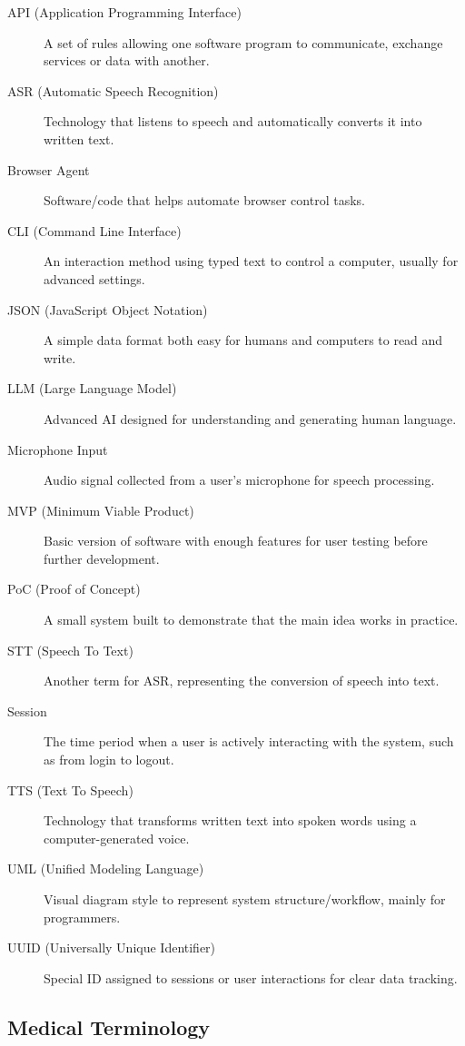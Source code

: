 \documentclass[11pt]{article}
\begin{document}
\begin{description}
  \item[API (Application Programming Interface)] A set of rules allowing one software program to communicate, exchange services or data with another.
  \item[ASR (Automatic Speech Recognition)] Technology that listens to speech and automatically converts it into written text.
  \item[Browser Agent] Software/code that helps automate browser control tasks.
  \item[CLI (Command Line Interface)] An interaction method using typed text to control a computer, usually for advanced settings.
  \item[JSON (JavaScript Object Notation)] A simple data format both easy for humans and computers to read and write.
  \item[LLM (Large Language Model)] Advanced AI designed for understanding and generating human language.
  \item[Microphone Input] Audio signal collected from a user’s microphone for speech processing.
  \item[MVP (Minimum Viable Product)] Basic version of software with enough features for user testing before further development.
  \item[PoC (Proof of Concept)] A small system built to demonstrate that the main idea works in practice.
  \item[STT (Speech To Text)] Another term for ASR, representing the conversion of speech into text.
  \item[Session] The time period when a user is actively interacting with the system, such as from login to logout.
  \item[TTS (Text To Speech)] Technology that transforms written text into spoken words using a computer-generated voice.
  \item[UML (Unified Modeling Language)] Visual diagram style to represent system structure/workflow, mainly for programmers.
  \item[UUID (Universally Unique Identifier)] Special ID assigned to sessions or user interactions for clear data tracking.
\end{description}

\subsection*{Medical Terminology}
\end{document}
